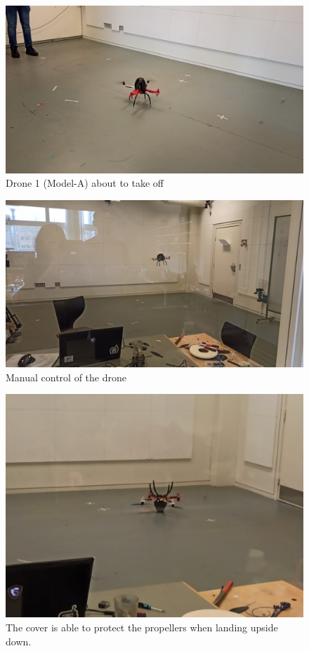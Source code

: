 \begin{figure} [!ht]
    \centering
    \includegraphics[width=\textwidth]{Figures/testing/drone_floor.jpg}
    \caption{Drone 1 (Model-A) about to take off}
    \label{fig:test_floor}
\end{figure}


\begin{figure} [!ht]
    \centering
    \includegraphics[width=\textwidth]{Figures/testing/drone_flying_lab.jpg}
    \caption{Manual control of the drone}\label{fig:test_fly}
\end{figure}


\begin{figure} [!ht]
    \centering
    \includegraphics[width=\textwidth]{Figures/testing/SURPISEEE.jpg}
    \caption{The cover is able to protect the propellers when landing upside down.}\label{fig:test_lmao}
\end{figure}